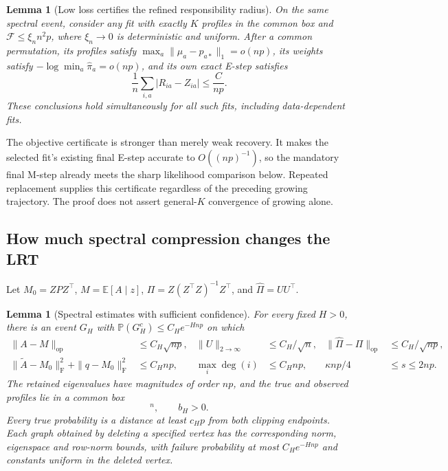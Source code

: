 \documentclass[11pt]{article}
\newtheorem{lemma}[theorem]{Lemma}
\theoremstyle{definition}
\theoremstyle{remark}
\newcommand{\E}{\mathbb E}
\newcommand{\PP}{\mathbb P}
\numberwithin{equation}{section}
\begin{document}
\begin{lemma}[Low loss certifies the refined responsibility radius]
\label{lem:low-loss-responsibilities}
On the same spectral event, consider any fit with exactly $K$ profiles in the common box and $\mathcal F\le\xi_n n^2p$, where $\xi_n\to0$ is deterministic and uniform. After a common permutation, its profiles satisfy $\max_a\|\mu_a-p_{a*}\|_1=o(np)$, its weights satisfy $-\log\min_a\widehat\pi_a=o(np)$, and its own exact E-step satisfies
\begin{equation}
 \frac1n\sum_{i,a}|R_{ia}-Z_{ia}|\le\frac{C}{np}.
 \label{eq:weak-responsibilities}
\end{equation}
These conclusions hold simultaneously for all such fits, including data-dependent fits.
\end{lemma}

The objective certificate is stronger than merely weak recovery. It makes the selected fit's existing final E-step accurate to $O((np)^{-1})$, so the mandatory final M-step already meets the sharp likelihood comparison below. Repeated replacement supplies this certificate regardless of the preceding growing trajectory. The proof does not assert general-$K$ convergence of growing alone.

\subsection{How much spectral compression changes the LRT}
Let $M_0=ZPZ^\top$, $M=\E[A\mid z]$, $\Pi=Z(Z^\top Z)^{-1}Z^\top$, and $\widehat\Pi=UU^\top$.

\begin{lemma}[Spectral estimates with sufficient confidence]
\label{lem:full-spectral}
For every fixed $H>0$, there is an event $G_H$ with $\PP(G_H^c)\le C_H e^{-Hnp}$ on which
\begin{align}
 \|A-M\|_{\mathrm{op}}&\le C_H\sqrt{np},&
 \|U\|_{2\to\infty}&\le C_H/\sqrt n,&
 \|\widehat\Pi-\Pi\|_{\mathrm{op}}&\le C_H/\sqrt{np},
 \label{eq:spectral-input}\\
 \|\widetilde A-M_0\|_{\mathrm F}^2
   +\|q-M_0\|_{\mathrm F}^2&\le C_Hnp,&
 \max_i\deg(i)&\le C_Hnp,&
 \kappa np/4&\le s\le2np.
 \label{eq:general-profile-errors}
\end{align}
The retained eigenvalues have magnitudes of order $np$, and the true and observed profiles lie in a common box
\begin{equation}
 [c_Hp,\,\min\{C_Hp,1-b_H\}]^n,
 \qquad b_H>0.
 \label{eq:general-profile-box}
\end{equation}
Every true probability is a distance at least $c_Hp$ from both clipping endpoints. Each graph obtained by deleting a specified vertex has the corresponding norm, eigenspace and row-norm bounds, with failure probability at most $C_H e^{-Hnp}$ and constants uniform in the deleted vertex.
\end{lemma}
\end{document}
